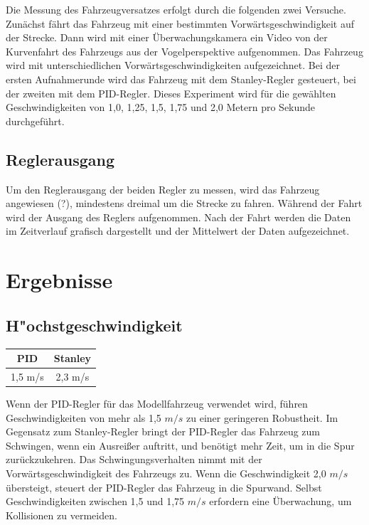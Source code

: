 \documentclass[arbeit=studie,oneside,BCOR=12mm]{ArbeitRST}
\begin{document}
Die Messung des Fahrzeugversatzes erfolgt durch die folgenden zwei Versuche.
Zunächst fährt das Fahrzeug mit einer bestimmten Vorwärtsgeschwindigkeit auf
der Strecke. Dann wird mit einer Überwachungskamera ein Video von der
Kurvenfahrt des Fahrzeugs aus der Vogelperspektive aufgenommen. Das Fahrzeug
wird mit unterschiedlichen Vorwärtsgeschwindigkeiten aufgezeichnet. Bei der
ersten Aufnahmerunde wird das Fahrzeug mit dem Stanley-Regler gesteuert, bei
der zweiten mit dem PID-Regler. Dieses Experiment wird für die gewählten
Geschwindigkeiten von 1,0, 1,25, 1,5, 1,75 und 2,0 Metern pro Sekunde
durchgeführt.

\subsection{Reglerausgang}

Um den Reglerausgang der beiden Regler zu messen, wird das Fahrzeug angewiesen
(?), mindestens dreimal um die Strecke zu fahren. Während der Fahrt wird der
Ausgang des Reglers aufgenommen. Nach der Fahrt werden die Daten im Zeitverlauf
grafisch dargestellt und der Mittelwert der Daten aufgezeichnet. 

\section{Ergebnisse}

\subsection{H"ochstgeschwindigkeit}
\begin{center}
\begin{tabular}{|c|c|}
\hline
    PID & Stanley \\
\hline
\hline
    1,5 m/s & 2,3 m/s \\
\hline
\end{tabular}
\end{center}

Wenn der PID-Regler für das Modellfahrzeug verwendet wird, führen
Geschwindigkeiten von mehr als 1,5 $m/s$ zu einer geringeren Robustheit. Im
Gegensatz zum Stanley-Regler bringt der PID-Regler das Fahrzeug zum Schwingen,
wenn ein Ausreißer auftritt, und benötigt mehr Zeit, um in die Spur
zurückzukehren. Das Schwingungsverhalten nimmt mit der Vorwärtsgeschwindigkeit
des Fahrzeugs zu. Wenn die Geschwindigkeit 2,0 $m/s$ übersteigt, steuert der
PID-Regler das Fahrzeug in die Spurwand. Selbst Geschwindigkeiten zwischen 1,5
und 1,75 $m/s$ erfordern eine Überwachung, um Kollisionen zu vermeiden.
\end{document}
